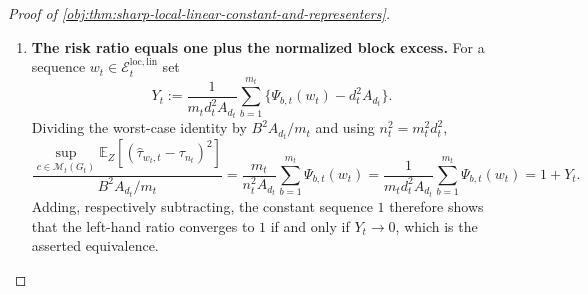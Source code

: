 \documentclass[11pt]{article}
\begin{document}
\begin{proof}[Proof of \cref{obj:thm:sharp-local-linear-constant-and-representers}]
\begin{enumerate}
Fix a block \(V_b\) and an admissible choice \((\varepsilon_i,S_i)_{i\in V_b}\) in \(\Psi_{b,t}\).  All units of \(V_b\) carry the same weight \(g_{d}(Z_b)\), so
\[
\sum_{i\in V_b}\varepsilon_i\bigl\{w^0_{i,t}(Z_b)Z_{S_i}-\mathbf 1(S_i\ne\varnothing)\bigr\}
=
g_{d}(Z_b)F(Z_b)-\Lambda,
\]
\[
F(Z_b):=\sum_{i\in V_b}\varepsilon_iZ_{S_i},
\qquad
\Lambda:=\sum_{i\in V_b}\varepsilon_i\mathbf 1(S_i\ne\varnothing).
\]
The block-score identities give \(\mathbb E_Z[g_{d}(Z_b)F(Z_b)]=\Lambda\), whence
\[
\mathbb E_Z\!\left[\bigl(g_{d}(Z_b)F(Z_b)-\Lambda\bigr)^2\right]
=
\mathbb E_Z\!\left[\bigl(g_{d}(Z_b)F(Z_b)\bigr)^2\right]-\Lambda^2
\le
\mathbb E_Z\!\left[\bigl(g_{d}(Z_b)F(Z_b)\bigr)^2\right].
\]
Since \(0\le Z_{S_i}\le1\), \(|\varepsilon_i|=1\) and \(|V_b|=d\), we have \(|F(Z_b)|\le d\) pointwise, so
\[
\mathbb E_Z\!\left[\bigl(g_{d}(Z_b)F(Z_b)\bigr)^2\right]
\le
d^2\,\mathbb E_Z[g_{d}(Z_b)^2]
=
d^2A .
\]
Maximizing over admissible choices gives the upper bound, and the empty-monomial construction gives the reverse inequality for the same canonical weights, so
\[
\Psi_{b,t}(w^0)\le d^2A,
\qquad\text{and}\qquad
\Psi_{b,t}(w^0)=d^2A .
\]
By the worst-case identity and the per-block lower bound, every \(w\in\mathcal E_t^{\mathrm{loc,lin}}\) satisfies
\[
\sup_{c\in\mathcal M_t(G_t)}\mathbb E_Z\!\left[(\widehat\tau_{w,t}-\tau_{n})^2\right]
=
\frac{B^2}{n^2}\sum_{b=1}^{m}\Psi_{b,t}(w)
\ge
\frac{B^2}{n^2}m d^2A
=
\frac{B^2A}{m},
\]
the last equality because \(n=md\); and the same computation with \(\Psi_{b,t}(w^0)=d^2A\) turns the inequality into an equality for \(w^0\).  Taking the infimum over \(\mathcal E_t^{\mathrm{loc,lin}}\),
\[
R_t^{\mathrm{loc,lin}}=\frac{B^2A_{d_t}}{m_t}
=\frac{B^2d_tA_{d_t}}{n_t},
\]
where the second equality is again \(n_t=m_td_t\). %

\item \textbf{The risk ratio equals one plus the normalized block excess.}  For a sequence \(w_t\in\mathcal E_t^{\mathrm{loc,lin}}\) set
\[
Y_t:=
\frac{1}{m_td_t^2A_{d_t}}
\sum_{b=1}^{m_t}\bigl\{\Psi_{b,t}(w_t)-d_t^2A_{d_t}\bigr\}.
\]
Dividing the worst-case identity by \(B^2A_{d_t}/m_t\) and using \(n_t^2=m_t^2d_t^2\),
\[
\frac{
\sup_{c\in\mathcal M_t(G_t)}\mathbb E_Z[(\widehat\tau_{w_t,t}-\tau_{n_t})^2]
}{
B^2A_{d_t}/m_t
}
=
\frac{m_t}{n_t^2A_{d_t}}\sum_{b=1}^{m_t}\Psi_{b,t}(w_t)
=
\frac{1}{m_td_t^2A_{d_t}}\sum_{b=1}^{m_t}\Psi_{b,t}(w_t)
=
1+Y_t .
\]
Adding, respectively subtracting, the constant sequence \(1\) therefore shows that the left-hand ratio converges to \(1\) if and only if \(Y_t\to0\), which is the asserted equivalence. %


\end{enumerate}
\end{proof}
\end{document}
